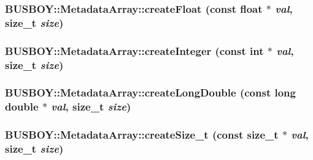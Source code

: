 \label{classBUSBOY_1_1MetadataArray_a4703f8e6898cd711ddec3b0c2a18abfc}
\hypertarget{classBUSBOY_1_1MetadataArray_a15cec39e2fe2bbd4954c918b4f5c4b86}{
\subsubsection[{createFloat}]{ BUSBOY::MetadataArray::createFloat (const float $\ast$ {\em val}, \/  size\_\-t {\em size})}}
\label{classBUSBOY_1_1MetadataArray_a15cec39e2fe2bbd4954c918b4f5c4b86}
\hypertarget{classBUSBOY_1_1MetadataArray_a0a2f1689131a0393e438d31c8aa16f52}{
\subsubsection[{createInteger}]{ BUSBOY::MetadataArray::createInteger (const int $\ast$ {\em val}, \/  size\_\-t {\em size})}}
\label{classBUSBOY_1_1MetadataArray_a0a2f1689131a0393e438d31c8aa16f52}
\hypertarget{classBUSBOY_1_1MetadataArray_a8597b20cc58014bd57c5bfae63c12e4c}{
\subsubsection[{createLongDouble}]{ BUSBOY::MetadataArray::createLongDouble (const long double $\ast$ {\em val}, \/  size\_\-t {\em size})}}
\label{classBUSBOY_1_1MetadataArray_a8597b20cc58014bd57c5bfae63c12e4c}
\hypertarget{classBUSBOY_1_1MetadataArray_a5215e46b13859c6f7efef8536f76d6ad}{
\subsubsection[{createSize\_\-t}]{ BUSBOY::MetadataArray::createSize\_\-t (const size\_\-t $\ast$ {\em val}, \/  size\_\-t {\em size})}}
